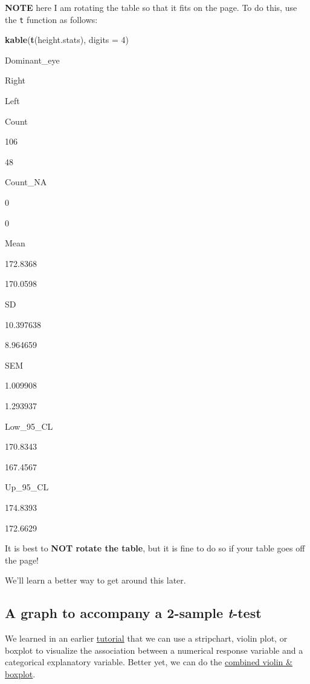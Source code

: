 \documentclass[
]{book}
\newenvironment{Shaded}{\begin{snugshade}}{\end{snugshade}}
\newcommand{\AttributeTok}[1]{\textcolor[rgb]{0.13,0.29,0.53}{#1}}
\newcommand{\DecValTok}[1]{\textcolor[rgb]{0.00,0.00,0.81}{#1}}
\newcommand{\FunctionTok}[1]{\textcolor[rgb]{0.13,0.29,0.53}{\textbf{#1}}}
\newcommand{\NormalTok}[1]{#1}
\begin{document}
\textbf{NOTE} here I am rotating the table so that it fits on the page. To do this, use the \texttt{t} function as follows:

\begin{Shaded}
\begin{Highlighting}[]
\FunctionTok{kable}\NormalTok{(}\FunctionTok{t}\NormalTok{(height.stats), }\AttributeTok{digits =} \DecValTok{4}\NormalTok{)}
\end{Highlighting}
\end{Shaded}

Dominant\_eye

Right

Left

Count

106

48

Count\_NA

0

0

Mean

172.8368

170.0598

SD

10.397638

8.964659

SEM

1.009908

1.293937

Low\_95\_CL

170.8343

167.4567

Up\_95\_CL

174.8393

172.6629

It is best to \textbf{NOT rotate the table}, but it is fine to do so if your table goes off the page!

We'll learn a better way to get around this later.

\subsection{\texorpdfstring{A graph to accompany a 2-sample \emph{t}-test}{A graph to accompany a 2-sample t-test}}\label{graph_2samp}

We learned in an earlier \hyperref[numeric_vs_cat]{tutorial} that we can use a stripchart, violin plot, or boxplot to visualize the association between a numerical response variable and a categorical explanatory variable. Better yet, we can do the \hyperref[bestplot]{combined violin \& boxplot}.
\end{document}

